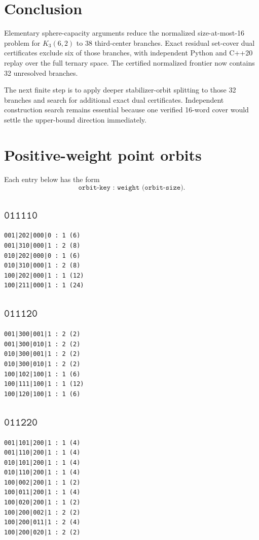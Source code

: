 \documentclass[11pt]{article}
\newcommand{\codeword}[1]{\texttt{#1}}
\begin{document}
\section{Conclusion}

Elementary sphere-capacity arguments reduce the normalized size-at-most-16
problem for \(K_3(6,2)\) to 38 third-center branches.  Exact residual
set-cover dual certificates exclude six of those branches, with independent
Python and C++20 replay over the full ternary space.  The certified
normalized frontier now contains 32 unresolved branches.

The next finite step is to apply deeper stabilizer-orbit splitting to those
32 branches and search for additional exact dual certificates.  Independent
construction search remains essential because one verified 16-word cover
would settle the upper-bound direction immediately.

\appendix

\section{Positive-weight point orbits}
\label{app:weights}

Each entry below has the form
\[
  \texttt{orbit-key : weight (orbit-size)}.
\]

\subsection*{\(\codeword{011110}\)}
\begin{Verbatim}[fontsize=\small]
001|202|000|0 : 1 (6)
001|310|000|1 : 2 (8)
010|202|000|0 : 1 (6)
010|310|000|1 : 2 (8)
100|202|000|1 : 1 (12)
100|211|000|1 : 1 (24)
\end{Verbatim}

\subsection*{\(\codeword{011120}\)}
\begin{Verbatim}[fontsize=\small]
001|300|001|1 : 2 (2)
001|300|010|1 : 2 (2)
010|300|001|1 : 2 (2)
010|300|010|1 : 2 (2)
100|102|100|1 : 1 (6)
100|111|100|1 : 1 (12)
100|120|100|1 : 1 (6)
\end{Verbatim}

\subsection*{\(\codeword{011220}\)}
\begin{Verbatim}[fontsize=\small]
001|101|200|1 : 1 (4)
001|110|200|1 : 1 (4)
010|101|200|1 : 1 (4)
010|110|200|1 : 1 (4)
100|002|200|1 : 1 (2)
100|011|200|1 : 1 (4)
100|020|200|1 : 1 (2)
100|200|002|1 : 2 (2)
100|200|011|1 : 2 (4)
100|200|020|1 : 2 (2)
\end{Verbatim}
\end{document}
